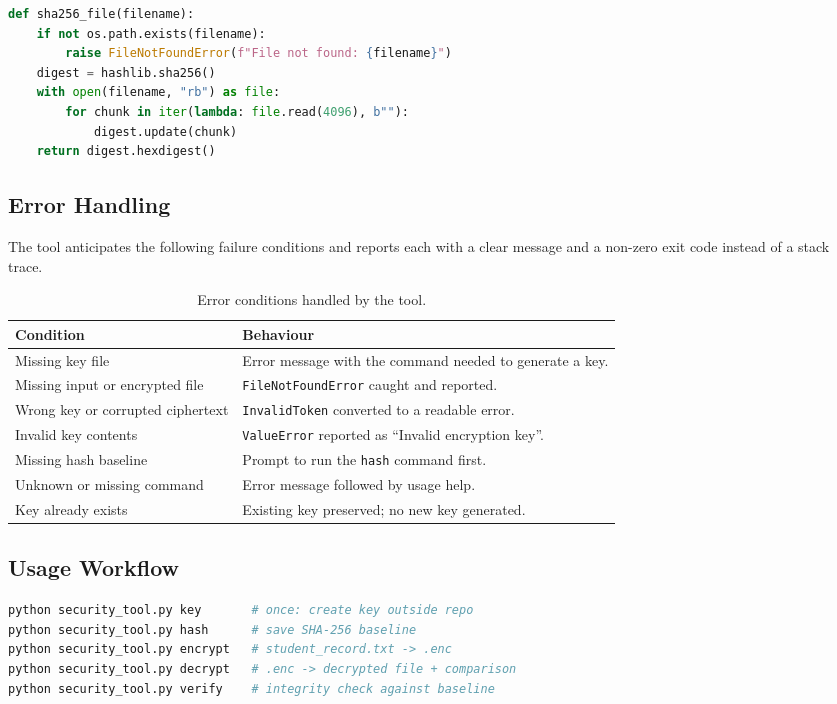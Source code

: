 \documentclass[11pt,a4paper]{article}
\begin{document}
\begin{lstlisting}[language=Python,caption={SHA-256 of a file.}]
def sha256_file(filename):
    if not os.path.exists(filename):
        raise FileNotFoundError(f"File not found: {filename}")
    digest = hashlib.sha256()
    with open(filename, "rb") as file:
        for chunk in iter(lambda: file.read(4096), b""):
            digest.update(chunk)
    return digest.hexdigest()
\end{lstlisting}

\subsection{Error Handling}
The tool anticipates the following failure conditions and reports each with a clear
message and a non-zero exit code instead of a stack trace.

\begin{table}[h!]
\centering
\renewcommand{\arraystretch}{1.3}
\begin{tabular}{@{}p{5.5cm} p{9cm}@{}}
\toprule
\textbf{Condition} & \textbf{Behaviour} \\
\midrule
Missing key file & Error message with the command needed to generate a key. \\
Missing input or encrypted file & \texttt{FileNotFoundError} caught and reported. \\
Wrong key or corrupted ciphertext & \texttt{InvalidToken} converted to a readable error. \\
Invalid key contents & \texttt{ValueError} reported as ``Invalid encryption key''. \\
Missing hash baseline & Prompt to run the \texttt{hash} command first. \\
Unknown or missing command & Error message followed by usage help. \\
Key already exists & Existing key preserved; no new key generated. \\
\bottomrule
\end{tabular}
\caption{Error conditions handled by the tool.}
\end{table}

\subsection{Usage Workflow}
\begin{lstlisting}[language=bash,numbers=none]
python security_tool.py key       # once: create key outside repo
python security_tool.py hash      # save SHA-256 baseline
python security_tool.py encrypt   # student_record.txt -> .enc
python security_tool.py decrypt   # .enc -> decrypted file + comparison
python security_tool.py verify    # integrity check against baseline
\end{lstlisting}
\end{document}
